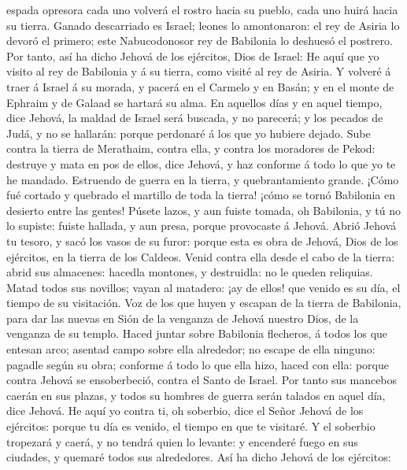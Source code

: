 espada opresora cada uno volverá el rostro hacia su pueblo, cada uno
huirá hacia su tierra.  Ganado descarriado es Israel;
leones lo amontonaron: el rey de Asiria lo devoró el primero; este
Nabucodonosor rey de Babilonia lo deshuesó el postrero. 
Por tanto, así ha dicho Jehová de los ejércitos, Dios de Israel: He aquí
que yo visito al rey de Babilonia y á su tierra, como visité al rey de
Asiria.  Y volveré á traer á Israel á su morada, y pacerá
en el Carmelo y en Basán; y en el monte de Ephraim y de Galaad se
hartará su alma.  En aquellos días y en aquel tiempo, dice
Jehová, la maldad de Israel será buscada, y no parecerá; y los pecados
de Judá, y no se hallarán: porque perdonaré á los que yo hubiere dejado.
 Sube contra la tierra de Merathaim, contra ella, y contra
los moradores de Pekod: destruye y mata en pos de ellos, dice Jehová, y
haz conforme á todo lo que yo te he mandado.  Estruendo de
guerra en la tierra, y quebrantamiento grande.  ¡Cómo fué
cortado y quebrado el martillo de toda la tierra! ¡cómo se tornó
Babilonia en desierto entre las gentes!  Púsete lazos, y
aun fuiste tomada, oh Babilonia, y tú no lo supiste: fuiste hallada, y
aun presa, porque provocaste á Jehová.  Abrió Jehová tu
tesoro, y sacó los vasos de su furor: porque esta es obra de Jehová,
Dios de los ejércitos, en la tierra de los Caldeos.  Venid
contra ella desde el cabo de la tierra: abrid sus almacenes: hacedla
montones, y destruidla: no le queden reliquias.  Matad
todos sus novillos; vayan al matadero: ¡ay de ellos! que venido es su
día, el tiempo de su visitación.  Voz de los que huyen y
escapan de la tierra de Babilonia, para dar las nuevas en Sión de la
venganza de Jehová nuestro Dios, de la venganza de su templo.
 Haced juntar sobre Babilonia flecheros, á todos los que
entesan arco; asentad campo sobre ella alrededor; no escape de ella
ninguno: pagadle según su obra; conforme á todo lo que ella hizo, haced
con ella: porque contra Jehová se ensoberbeció, contra el Santo de
Israel.  Por tanto sus mancebos caerán en sus plazas, y
todos su hombres de guerra serán talados en aquel día, dice Jehová.
 He aquí yo contra ti, oh soberbio, dice el Señor Jehová de
los ejércitos: porque tu día es venido, el tiempo en que te visitaré.
 Y el soberbio tropezará y caerá, y no tendrá quien lo
levante: y encenderé fuego en sus ciudades, y quemaré todos sus
alrededores.  Así ha dicho Jehová de los ejércitos:
